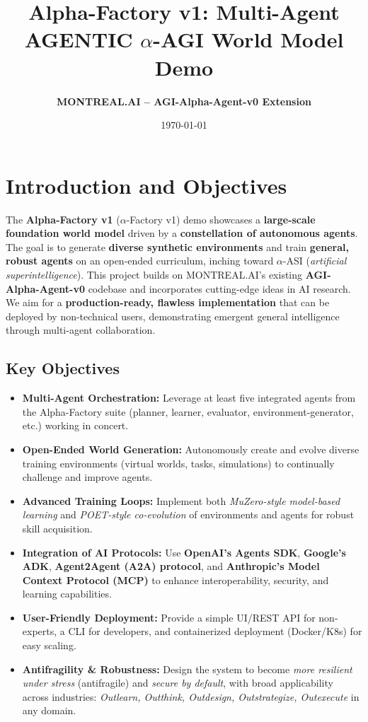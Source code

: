 \documentclass{article}
\title{\textbf{Alpha-Factory v1: Multi-Agent AGENTIC \boldmath$\alpha$-AGI World Model Demo}}
\author{\textbf{MONTREAL.AI -- AGI-Alpha-Agent-v0 Extension}}
\date{\today}
\begin{document}
\maketitle

\section{Introduction and Objectives}

The \textbf{Alpha-Factory v1} (\(\alpha\)-Factory v1) demo showcases a \textbf{large-scale foundation world model} driven by a \textbf{constellation of autonomous agents}. The goal is to generate \textbf{diverse synthetic environments} and train \textbf{general, robust agents} on an open-ended curriculum, inching toward \(\alpha\)-ASI (\emph{artificial superintelligence}). This project builds on MONTREAL.AI’s existing \textbf{AGI-Alpha-Agent-v0} codebase and incorporates cutting-edge ideas in AI research. We aim for a \textbf{production-ready, flawless implementation} that can be deployed by non-technical users, demonstrating emergent general intelligence through multi-agent collaboration.

\subsection{Key Objectives}

\begin{itemize}
  \item \textbf{Multi-Agent Orchestration:} Leverage at least five integrated agents from the Alpha-Factory suite (planner, learner, evaluator, environment-generator, etc.) working in concert.
  \item \textbf{Open-Ended World Generation:} Autonomously create and evolve diverse training environments (virtual worlds, tasks, simulations) to continually challenge and improve agents.
  \item \textbf{Advanced Training Loops:} Implement both \emph{MuZero-style model-based learning} and \emph{POET-style co-evolution} of environments and agents for robust skill acquisition.
  \item \textbf{Integration of AI Protocols:} Use \textbf{OpenAI’s Agents SDK}, \textbf{Google’s ADK}, \textbf{Agent2Agent (A2A) protocol}, and \textbf{Anthropic’s Model Context Protocol (MCP)} to enhance interoperability, security, and learning capabilities.
  \item \textbf{User-Friendly Deployment:} Provide a simple UI/REST API for non-experts, a CLI for developers, and containerized deployment (Docker/K8s) for easy scaling.
  \item \textbf{Antifragility \& Robustness:} Design the system to become \emph{more resilient under stress} (antifragile) and \emph{secure by default}, with broad applicability across industries:
  \emph{Outlearn, Outthink, Outdesign, Outstrategize, Outexecute} in any domain.
\end{itemize}
\end{document}

